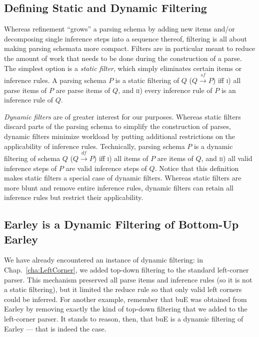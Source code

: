 \subsection{Defining Static and Dynamic Filtering}

Whereas refinement ``grows'' a parsing schema by adding new items and\slash or decomposing single inference steps into a sequence thereof, filtering is all about making parsing schemata more compact.
Filters are in particular meant to reduce the amount of work that needs to be done during the construction of a parse.
The simplest option is a \emph{static filter}, which simply eliminates certain items or inference rules.
A parsing schema $P$ is a static filtering of $Q$ ($Q \xrightarrow{\mathit{sf}} P$) iff \textsc{i}) all parse items of $P$ are parse items of $Q$, and \textsc{ii}) every inference rule of $P$ is an inference rule of $Q$.

\emph{Dynamic filters} are of greater interest for our purposes.
Whereas static filters discard parts of the parsing schema to simplify the construction of parses, dynamic filters minimize workload by putting additional restrictions on the applicability of inference rules.
Technically, parsing schema $P$ is a dynamic filtering of schema $Q$ ($Q \xrightarrow{\mathit{df}} P$) iff \textsc{i}) all items of $P$ are items of $Q$, and \textsc{ii}) all valid inference steps of $P$ are valid inference steps of $Q$.
Notice that this definition makes static filters a special case of dynamic filters.
Whereas static filters are more blunt and remove entire inference rules, dynamic filters can retain all inference rules but restrict their applicability.

\subsection{Earley is a Dynamic Filtering of Bottom-Up Earley}

We have already encountered an instance of dynamic filtering: in Chap.~\ref{cha:LeftCorner}, we added top-down filtering to the standard left-corner parser.
This mechanism preserved all parse items and inference rules (so it is not a static filtering), but it limited the reduce rule so that only valid left corners could be inferred.
For another example, remember that buE was obtained from Earley by removing exactly the kind of top-down filtering that we added to the left-corner parser.
It stands to reason, then, that buE is a dynamic filtering of Earley --- that is indeed the case.

